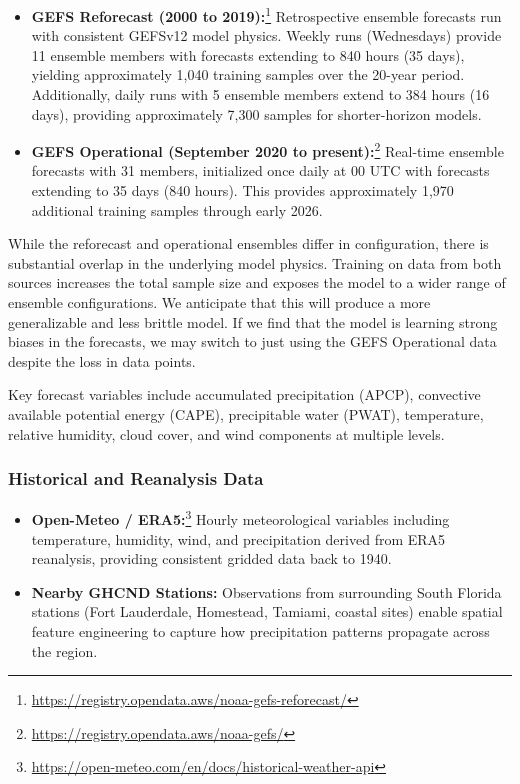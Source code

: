 \documentclass[11pt]{article}
\begin{document}
\begin{itemize}
    \item \textbf{GEFS Reforecast (2000 to 2019):}\footnote{\url{https://registry.opendata.aws/noaa-gefs-reforecast/}} Retrospective ensemble forecasts run with consistent GEFSv12 model physics. Weekly runs (Wednesdays) provide 11 ensemble members with forecasts extending to 840 hours (35 days), yielding approximately 1,040 training samples over the 20-year period. Additionally, daily runs with 5 ensemble members extend to 384 hours (16 days), providing approximately 7,300 samples for shorter-horizon models.

    \item \textbf{GEFS Operational (September 2020 to present):}\footnote{\url{https://registry.opendata.aws/noaa-gefs/}} Real-time ensemble forecasts with 31 members, initialized once daily at 00 UTC with forecasts extending to 35 days (840 hours). This provides approximately 1,970 additional training samples through early 2026.
\end{itemize}

While the reforecast and operational ensembles differ in configuration, there is substantial overlap in the underlying model physics. Training on data from both sources increases the total sample size and exposes the model to a wider range of ensemble configurations. We anticipate that this will produce a more generalizable and less brittle model. If we find that the model is learning strong biases in the forecasts, we may switch to just using the GEFS Operational data despite the loss in data points. 

Key forecast variables include accumulated precipitation (APCP), convective available potential energy (CAPE), precipitable water (PWAT), temperature, relative humidity, cloud cover, and wind components at multiple levels.

\subsubsection{Historical and Reanalysis Data}
\begin{itemize}
    \item \textbf{Open-Meteo / ERA5:}\footnote{\url{https://open-meteo.com/en/docs/historical-weather-api}} Hourly meteorological variables including temperature, humidity, wind, and precipitation derived from ERA5 reanalysis, providing consistent gridded data back to 1940.

    \item \textbf{Nearby GHCND Stations:} Observations from surrounding South Florida stations (Fort Lauderdale, Homestead, Tamiami, coastal sites) enable spatial feature engineering to capture how precipitation patterns propagate across the region.
\end{itemize}
\end{document}

